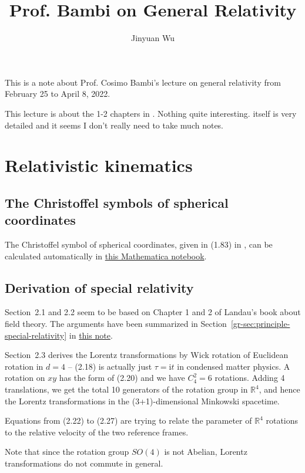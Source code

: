 \documentclass[hyperref, a4paper]{article}
\title{Prof. Bambi on General Relativity}
\author{Jinyuan Wu}
\newcommand*{\ii}{\mathrm{i}}
\newcommand{\grnote}{\href{../relativity/relativistic.pdf}{this note}}
\begin{document}
\maketitle

This is a note about Prof. Cosimo Bambi's lecture on general relativity from February 25 to April 8, 2022.

This lecture is about the 1-2 chapters in \cite{bambi2018introduction}. Nothing quite interesting.
\cite{bambi2018introduction} itself is very detailed and it seems I don't really need to take much notes.

\section{Relativistic kinematics}

\subsection{The Christoffel symbols of spherical coordinates}

The Christoffel symbol of spherical coordinates, given in (1.83) in \cite{bambi2018introduction}, can be 
calculated automatically in \href{spherical-coordinate-differential-geometry.nb}{this Mathematica notebook}.

\subsection{Derivation of special relativity}

Section~2.1 and 2.2 seem to be based on Chapter 1 and 2 of Landau's book about field theory. 
The arguments have been summarized in Section~\ref{gr-sec:principle-special-relativity} in \grnote.

Section~2.3 derives the Lorentz transformations by Wick rotation of Euclidean rotation in $d = 4$
-- (2.18) is actually just $\tau = \ii t$ in condensed matter physics.
A rotation on $xy$ has the form of (2.20) and we have $C_4^2 = 6$ rotations. Adding 4 translations,
we get the total 10 generators of the rotation group in $\mathbb{R}^4$, and hence the Lorentz transformations
in the (3+1)-dimensional Minkowski spacetime.

Equations from (2.22) to (2.27) are trying to relate the parameter of $\mathbb{R}^4$ rotations to the relative 
velocity of the two reference frames.

Note that since the rotation group $SO(4)$ is not Abelian, Lorentz transformations do not commute in general. 
\end{document}
